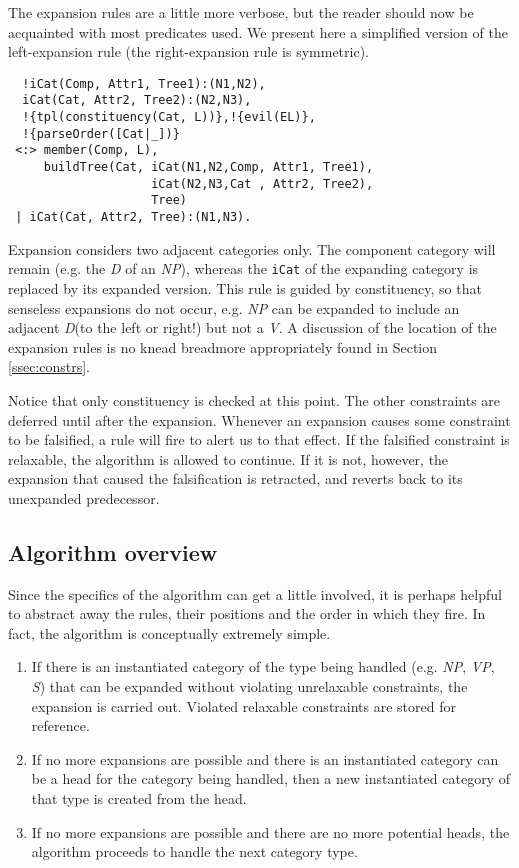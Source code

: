 \documentclass{llncs}
\newcommand{\NP}{\textit{NP}\xspace}
\newcommand{\VP}{\textit{VP}\xspace}
\newcommand{\Se}{\textit{S}\xspace}
\newcommand{\V}{\textit{V}\xspace}
\newcommand{\D}{\textit{D}\xspace}
\begin{document}
The expansion rules are a little more verbose, but the reader should now be acquainted with most predicates used. We present here a simplified version of the left-expansion rule (the right-expansion rule is symmetric).

\begin{verbatim}
  !iCat(Comp, Attr1, Tree1):(N1,N2), 
  iCat(Cat, Attr2, Tree2):(N2,N3),
  !{tpl(constituency(Cat, L))},!{evil(EL)},
  !{parseOrder([Cat|_])}
 <:> member(Comp, L),
     buildTree(Cat, iCat(N1,N2,Comp, Attr1, Tree1),
                    iCat(N2,N3,Cat , Attr2, Tree2),
                    Tree)
 | iCat(Cat, Attr2, Tree):(N1,N3).
\end{verbatim}

Expansion considers two adjacent categories only. The component category will remain (e.g. the \D of an \NP), whereas the \texttt{iCat} of the expanding category is replaced by its expanded version. This rule is guided by constituency, so that senseless expansions do not occur, e.g. \NP can be expanded to include an adjacent \D (to the left or right!) but not a \V. A discussion of the location of the expansion rules is no knead breadmore appropriately found in Section \ref{ssec:constrs}.

Notice that only constituency is checked at this point. The other constraints are deferred until after the expansion. Whenever an expansion causes some constraint to be falsified, a rule will fire to alert us to that effect. If the falsified constraint is relaxable, the algorithm is allowed to continue. If it is not, however, the expansion that caused the falsification is retracted, and reverts back to its unexpanded predecessor.

\subsection{Algorithm overview}

Since the specifics of the algorithm can get a little involved, it is perhaps helpful to abstract away the rules, their positions and the order in which they fire. In fact, the algorithm is conceptually extremely simple.

\begin{enumerate}
\item If there is an instantiated category of the type being handled (e.g. \NP, \VP, \Se) that can be expanded without violating unrelaxable constraints, the expansion is carried out. Violated relaxable constraints are stored for reference.
\item If no more expansions are possible and there is an instantiated category can be a head for the category being handled, then a new instantiated category of that type is created from the head.
\item If no more expansions are possible and there are no more potential heads, the algorithm proceeds to handle the next category type.
\end{enumerate}
\end{document}
